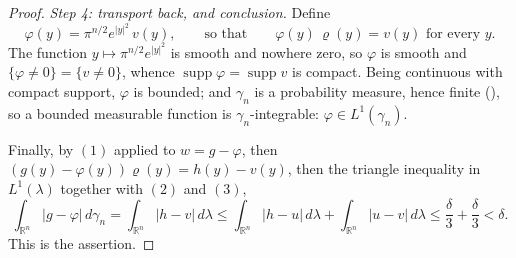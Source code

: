 \begin{proof}
\emph{Step 4: transport back, and conclusion.}
Define
\[
  \varphi(y) = \pi^{n/2}e^{|y|^2}\,v(y) ,
  \qquad\text{so that}\qquad
  \varphi(y)\,\varrho(y) = v(y) \text{ for every } y .
\]
The function $y \mapsto \pi^{n/2}e^{|y|^2}$ is smooth and nowhere zero, so
$\varphi$ is smooth and $\{\varphi \neq 0\} = \{v \neq 0\}$, whence
$\operatorname{supp}\varphi = \operatorname{supp}v$ is compact.  Being
continuous with compact support, $\varphi$ is bounded; and $\gamma_n$ is a
probability measure, hence finite (), so a bounded
measurable function is $\gamma_n$-integrable: $\varphi \in L^1(\gamma_n)$.

Finally, by $(1)$ applied to $w = g - \varphi$, then
$(g(y)-\varphi(y))\varrho(y) = h(y) - v(y)$, then the triangle inequality in
$L^1(\lambda)$ together with $(2)$ and $(3)$,
\[
  \int_{\mathbb{R}^n}|g - \varphi|\,d\gamma_n
    = \int_{\mathbb{R}^n}|h - v|\,d\lambda
    \leq \int_{\mathbb{R}^n}|h - u|\,d\lambda
      + \int_{\mathbb{R}^n}|u - v|\,d\lambda
    \leq \frac{\delta}{3} + \frac{\delta}{3} < \delta .
\]
This is the assertion.
\end{proof}
